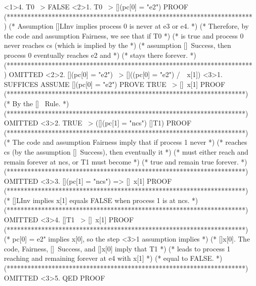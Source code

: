\documentclass[fleqn,leqno]{article}
\begin{document}
\begin{verbatim*}
<1>4. T0 ~> FALSE
  <2>1. T0 ~> [](pc[0] = "e2")                                                PROOF
    (***********************************************************************)
    (* Assumption []LInv implies process 0 is never at e3 or e4.           *)
    (* Therefore, by the code and assumption Fairness, we see that if T0   *)
    (* is true and process 0 never reaches cs (which is implied by the     *)
    (* assumption []~Success, then process 0 eventually reaches e2 and     *)
    (* stays there forever.                                                *)
    (***********************************************************************) OMITTED 
  <2>2. [](pc[0] = "e2") ~> []((pc[0] = "e2") /\ ~x[1])
    <3>1. SUFFICES ASSUME [](pc[0] = "e2")
                   PROVE  TRUE ~> []~x[1]                                     PROOF
      (*********************************************************************)
      (* By the []~ Rule.                                                  *)
      (*********************************************************************) OMITTED
    <3>2. TRUE ~> ([](pc[1] = "ncs") \/ []T1)                                 PROOF
      (*********************************************************************)
      (* The code and assumption Fairness imply that if process 1 never    *)
      (* reaches cs (by the assumption []~Success), then eventually it     *)
      (* must either reach and remain forever at ncs, or T1 must become    *)
      (* true and remain true forever.                                     *)
      (*********************************************************************) OMITTED
    <3>3. [](pc[1] = "ncs") => []~x[1]                                        PROOF
      (*********************************************************************)
      (* []LInv implies x[1] equals FALSE when process 1 is at ncs.        *)
      (*********************************************************************) OMITTED
    <3>4. []T1 ~> []~x[1]                                                     PROOF
      (*********************************************************************)
      (* pc[0] = e2" implies x[0], so the step <3>1 assumption implies     *)
      (* []x[0].  The code, Fairness, []~Success, and []x[0] imply that T1 *)
      (* leads to process 1 reaching and remaining forever at e4 with x[1] *)
      (* equal to FALSE.                                                   *)
      (*********************************************************************) OMITTED
    <3>5. QED                                                                 PROOF

\end{verbatim*}
\end{document}
